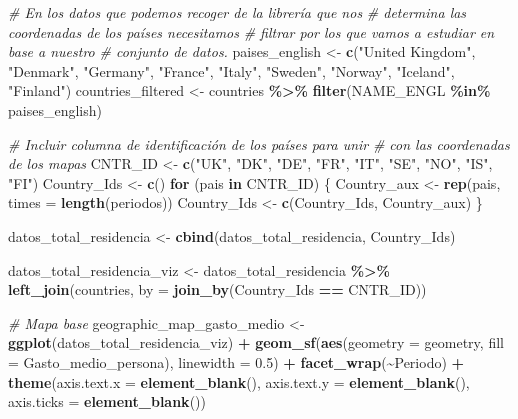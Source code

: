 \documentclass[data,article,submit,moreauthors,pdftex]{Definitions/mdpi}
\newenvironment{Shaded}{\begin{snugshade}}{\end{snugshade}}
\newcommand{\AttributeTok}[1]{\textcolor[rgb]{0.13,0.29,0.53}{#1}}
\newcommand{\CommentTok}[1]{\textcolor[rgb]{0.56,0.35,0.01}{\textit{#1}}}
\newcommand{\ControlFlowTok}[1]{\textcolor[rgb]{0.13,0.29,0.53}{\textbf{#1}}}
\newcommand{\FloatTok}[1]{\textcolor[rgb]{0.00,0.00,0.81}{#1}}
\newcommand{\FunctionTok}[1]{\textcolor[rgb]{0.13,0.29,0.53}{\textbf{#1}}}
\newcommand{\NormalTok}[1]{#1}
\newcommand{\OtherTok}[1]{\textcolor[rgb]{0.56,0.35,0.01}{#1}}
\newcommand{\SpecialCharTok}[1]{\textcolor[rgb]{0.81,0.36,0.00}{\textbf{#1}}}
\newcommand{\StringTok}[1]{\textcolor[rgb]{0.31,0.60,0.02}{#1}}
\begin{document}
\begin{Shaded}
\begin{Highlighting}[]
\CommentTok{\# En los datos que podemos recoger de la librería que nos}
\CommentTok{\# determina las coordenadas de los países necesitamos}
\CommentTok{\# filtrar por los que vamos a estudiar en base a nuestro}
\CommentTok{\# conjunto de datos.}
\NormalTok{paises\_english }\OtherTok{\textless{}{-}} \FunctionTok{c}\NormalTok{(}\StringTok{"United Kingdom"}\NormalTok{, }\StringTok{"Denmark"}\NormalTok{, }\StringTok{"Germany"}\NormalTok{, }\StringTok{"France"}\NormalTok{,}
    \StringTok{"Italy"}\NormalTok{, }\StringTok{"Sweden"}\NormalTok{, }\StringTok{"Norway"}\NormalTok{, }\StringTok{"Iceland"}\NormalTok{, }\StringTok{"Finland"}\NormalTok{)}
\NormalTok{countries\_filtered }\OtherTok{\textless{}{-}}\NormalTok{ countries }\SpecialCharTok{\%\textgreater{}\%}
    \FunctionTok{filter}\NormalTok{(NAME\_ENGL }\SpecialCharTok{\%in\%}\NormalTok{ paises\_english)}

\CommentTok{\# Incluir columna de identificación de los países para unir}
\CommentTok{\# con las coordenadas de los mapas}
\NormalTok{CNTR\_ID }\OtherTok{\textless{}{-}} \FunctionTok{c}\NormalTok{(}\StringTok{"UK"}\NormalTok{, }\StringTok{"DK"}\NormalTok{, }\StringTok{"DE"}\NormalTok{, }\StringTok{"FR"}\NormalTok{, }\StringTok{"IT"}\NormalTok{, }\StringTok{"SE"}\NormalTok{, }\StringTok{"NO"}\NormalTok{, }\StringTok{"IS"}\NormalTok{,}
    \StringTok{"FI"}\NormalTok{)}
\NormalTok{Country\_Ids }\OtherTok{\textless{}{-}} \FunctionTok{c}\NormalTok{()}
\ControlFlowTok{for}\NormalTok{ (pais }\ControlFlowTok{in}\NormalTok{ CNTR\_ID) \{}
\NormalTok{    Country\_aux }\OtherTok{\textless{}{-}} \FunctionTok{rep}\NormalTok{(pais, }\AttributeTok{times =} \FunctionTok{length}\NormalTok{(periodos))}
\NormalTok{    Country\_Ids }\OtherTok{\textless{}{-}} \FunctionTok{c}\NormalTok{(Country\_Ids, Country\_aux)}
\NormalTok{\}}

\NormalTok{datos\_total\_residencia }\OtherTok{\textless{}{-}} \FunctionTok{cbind}\NormalTok{(datos\_total\_residencia, Country\_Ids)}


\NormalTok{datos\_total\_residencia\_viz }\OtherTok{\textless{}{-}}\NormalTok{ datos\_total\_residencia }\SpecialCharTok{\%\textgreater{}\%}
    \FunctionTok{left\_join}\NormalTok{(countries, }\AttributeTok{by =} \FunctionTok{join\_by}\NormalTok{(Country\_Ids }\SpecialCharTok{==}\NormalTok{ CNTR\_ID))}



\CommentTok{\# Mapa base}
\NormalTok{geographic\_map\_gasto\_medio }\OtherTok{\textless{}{-}} \FunctionTok{ggplot}\NormalTok{(datos\_total\_residencia\_viz) }\SpecialCharTok{+}
    \FunctionTok{geom\_sf}\NormalTok{(}\FunctionTok{aes}\NormalTok{(}\AttributeTok{geometry =}\NormalTok{ geometry, }\AttributeTok{fill =}\NormalTok{ Gasto\_medio\_persona),}
        \AttributeTok{linewidth =} \FloatTok{0.5}\NormalTok{) }\SpecialCharTok{+} \FunctionTok{facet\_wrap}\NormalTok{(}\SpecialCharTok{\textasciitilde{}}\NormalTok{Periodo) }\SpecialCharTok{+} \FunctionTok{theme}\NormalTok{(}\AttributeTok{axis.text.x =} \FunctionTok{element\_blank}\NormalTok{(),}
    \AttributeTok{axis.text.y =} \FunctionTok{element\_blank}\NormalTok{(), }\AttributeTok{axis.ticks =} \FunctionTok{element\_blank}\NormalTok{())}


\end{Highlighting}
\end{Shaded}
\end{document}
